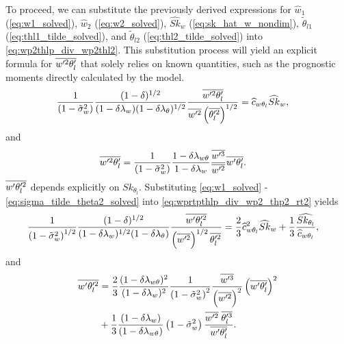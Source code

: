 To proceed, we can substitute the previously derived expressions for
$\widehat{w}_1$ (\cref{eq:w1_solved}), $\widehat{w}_2$ (\cref{eq:w2_solved}),
$\widehat{Sk}_w$ (\cref{eq:sk_hat_w_nondim}),
$\tilde{\theta}_{l1}$ (\cref{eq:thl1_tilde_solved}),
and $\tilde{\theta}_{l2}$ (\cref{eq:thl2_tilde_solved}) into \cref{eq:wp2thlp_div_wp2thl2}.
This substitution process will yield an explicit formula for $\overline{w'^2 \theta_l'}$ that solely relies on known quantities,
such as the prognostic moments directly calculated by the model.
\begin{align}
    \label{eq:wp2thlp_sk_w_solved}
    \frac{1}{\left( 1 - \tilde{\sigma}_w^2 \right)} \frac{(1-\delta)^{1/2}}{(1-\delta \lambda_w) (1-\delta \lambda_\theta)^{1/2}} \frac{\overline{w'^2\theta_l'}}{\overline{w'^2} \left(\overline{\theta_l'^2} \right)^{1/2}}
    &= \widehat{c}_{w\theta_l} \widehat{Sk}_w,
\end{align}
and
\begin{align}
    \label{eq:wp2thlp_solved}
    \overline{w'^2 \theta_l'}
    &= \frac{1}{\left( 1 - \tilde{\sigma}_w^2 \right)} \frac{1 - \delta \lambda_{w\theta}}{1-\delta \lambda_w} \frac{\overline{w'^3}}{\overline{w'^2}} \overline{w' \theta_l'}.
\end{align}
$\overline{w' \theta_l'^2}$ depends explicitly on $Sk_{\theta_l}$.
Substituting \cref{eq:w1_solved} - \cref{eq:sigma_tilde_theta2_solved}
into \cref{eq:wprtpthlp_div_wp2_thp2_rt2} yields
\begin{align}
    \label{eq:wpthlp2_sk_w_solved}
    \frac{1}{\left( 1 - \tilde{\sigma}_w^2 \right)^{1/2}} \frac{(1-\delta)^{1/2}}{(1-\delta \lambda_w)^{1/2} (1-\delta \lambda_\theta)} \frac{\overline{w'\theta_l'^2}}{\left(\overline{w'^2}\right)^{1/2} \overline{\theta_l'^2}}
    &= \frac{2}{3} \widehat{c}_{w\theta_l}^2 \widehat{Sk}_w + \frac{1}{3} \frac{ \widehat{Sk_{\theta_l}} } {\widehat{c}_{w\theta_l}},
\end{align}
and
\begin{align}
    \label{eq:wpthlp2_solved}
    \overline{w' \theta_l'^2}
    &= \frac{2}{3} \frac{(1-\delta \lambda_{w \theta})^2}{(1-\delta \lambda_w)^2} \frac{1}{\left( 1 - \tilde{\sigma}_w^2 \right)^2} \frac{\overline{w'^3}}{\left(\overline{w'^2} \right)^2} \left(\overline{w' \theta_l'} \right)^2 \nonumber\\
    &+ \frac{1}{3} \frac{(1-\delta \lambda_w)}{(1-\delta \lambda_{w \theta})} \left( 1 - \tilde{\sigma}_w^2 \right) \frac{\overline{w'^2} \; \overline{\theta_l'^3}}{\overline{w' \theta_l'}}.
\end{align}

